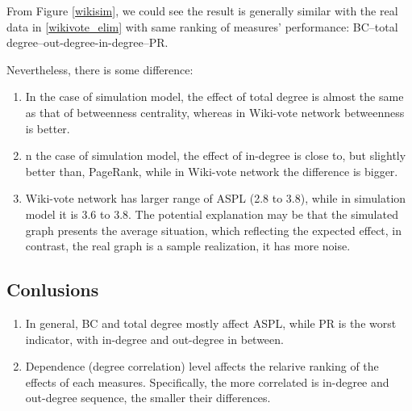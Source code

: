 \documentclass{article}
\begin{document}
\begin{enumerate}
From Figure \ref{wikisim},  we could see the result is generally similar with the real data in \ref{wikivote_elim} with same ranking of measures' performance: BC--total degree--out-degree-in-degree--PR.
\par Nevertheless, there is some difference:
\begin{enumerate}
\item  In the case of simulation model, the effect of total degree is almost the same as that of betweenness centrality, whereas in Wiki-vote network betweenness is better.
\item  n the case of simulation model, the effect of in-degree is close to, but slightly better than, PageRank, while in Wiki-vote network the difference is bigger.
\item Wiki-vote network has larger range of ASPL (2.8 to 3.8), while in simulation model it is 3.6 to 3.8. The potential explanation may be that the simulated graph presents the average situation, which reflecting the expected effect, in contrast, the real graph is a sample realization, it has more noise.
\end{enumerate}

\end{enumerate}

\subsection{Conlusions}
\begin{enumerate}
\item In general, BC and total degree mostly affect ASPL, while PR is the worst indicator, with in-degree and out-degree in between.
\item Dependence (degree correlation) level affects the relarive ranking of the effects of each measures. Specifically, the more correlated is in-degree and out-degree sequence, the smaller their differences.
\end{enumerate}
\end{document}
